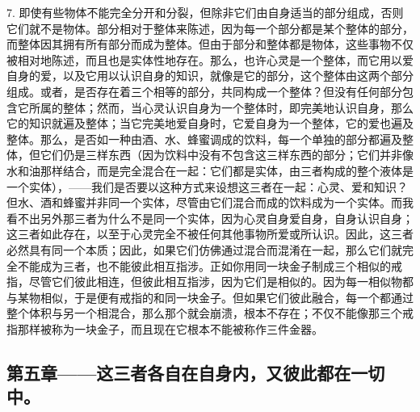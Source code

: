 7. 即使有些物体不能完全分开和分裂，但除非它们由自身适当的部分组成，否则它们就不是物体。部分相对于整体来陈述，因为每一个部分都是某个整体的部分，而整体因其拥有所有部分而成为整体。但由于部分和整体都是物体，这些事物不仅被相对地陈述，而且也是实体性地存在。那么，也许心灵是一个整体，而它用以爱自身的爱，以及它用以认识自身的知识，就像是它的部分，这个整体由这两个部分组成。或者，是否存在着三个相等的部分，共同构成一个整体？但没有任何部分包含它所属的整体；然而，当心灵认识自身为一个整体时，即完美地认识自身，那么它的知识就遍及整体；当它完美地爱自身时，它爱自身为一个整体，它的爱也遍及整体。那么，是否如一种由酒、水、蜂蜜调成的饮料，每一个单独的部分都遍及整体，但它们仍是三样东西（因为饮料中没有不包含这三样东西的部分；它们并非像水和油那样结合，而是完全混合在一起：它们都是实体，由三者构成的整个液体是一个实体），——我们是否要以这种方式来设想这三者在一起：心灵、爱和知识？但水、酒和蜂蜜并非同一个实体，尽管由它们混合而成的饮料成为一个实体。而我看不出另外那三者为什么不是同一个实体，因为心灵自身爱自身，自身认识自身；这三者如此存在，以至于心灵完全不被任何其他事物所爱或所认识。因此，这三者必然具有同一个本质；因此，如果它们仿佛通过混合而混淆在一起，那么它们就完全不能成为三者，也不能彼此相互指涉。正如你用同一块金子制成三个相似的戒指，尽管它们彼此相连，但彼此相互指涉，因为它们是相似的。因为每一相似物都与某物相似，于是便有戒指的和同一块金子。但如果它们彼此融合，每一个都通过整个体积与另一个相混合，那么那个就会崩溃，根本不存在；不仅不能像那三个戒指那样被称为一块金子，而且现在它根本不能被称作三件金器。\par


\subsection{第五章——这三者各自在自身内，又彼此都在一切中。}

